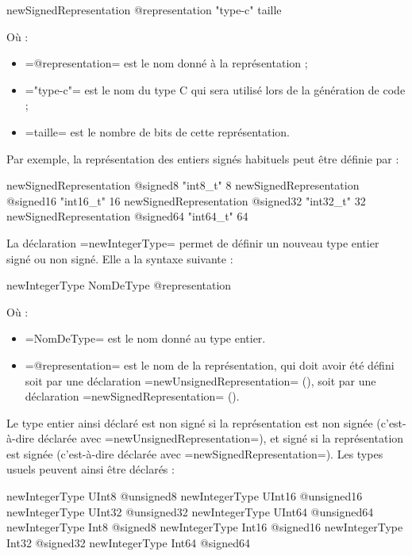 \begin{PLM}
newSignedRepresentation @representation "type-c" taille
\end{PLM}

Où :
\begin{itemize}
  \item \plm=@representation= est le nom donné à la représentation ;
  \item \plm="type-c"= est le nom du type C qui sera utilisé lors de la génération de code ;
  \item \plm=taille= est le nombre de bits de cette représentation.
\end{itemize}

Par exemple, la représentation des entiers signés habituels peut être définie par :
\begin{PLM}
newSignedRepresentation @signed8  "int8_t"   8
newSignedRepresentation @signed16 "int16_t" 16
newSignedRepresentation @signed32 "int32_t" 32
newSignedRepresentation @signed64 "int64_t" 64
\end{PLM}












La déclaration \plm=newIntegerType= permet de définir un nouveau type entier signé ou non signé. Elle a la syntaxe suivante :
\begin{PLM}
newIntegerType NomDeType @representation
\end{PLM}
Où :
\begin{itemize}
  \item \plm=NomDeType= est le nom donné au type entier.
  \item \plm=@representation= est le nom de la représentation, qui doit avoir été défini soit par une déclaration \plm=newUnsignedRepresentation= (), soit par une déclaration \plm=newSignedRepresentation= ().
\end{itemize}

Le type entier ainsi déclaré est non signé si la représentation est non signée (c'est-à-dire déclarée avec \plm=newUnsignedRepresentation=), et signé si la représentation est signée (c'est-à-dire déclarée avec \plm=newSignedRepresentation=). Les types usuels peuvent ainsi être déclarés :
\begin{PLM}
newIntegerType UInt8  @unsigned8
newIntegerType UInt16 @unsigned16
newIntegerType UInt32 @unsigned32
newIntegerType UInt64 @unsigned64
newIntegerType Int8  @signed8
newIntegerType Int16 @signed16
newIntegerType Int32 @signed32
newIntegerType Int64 @signed64
\end{PLM}





